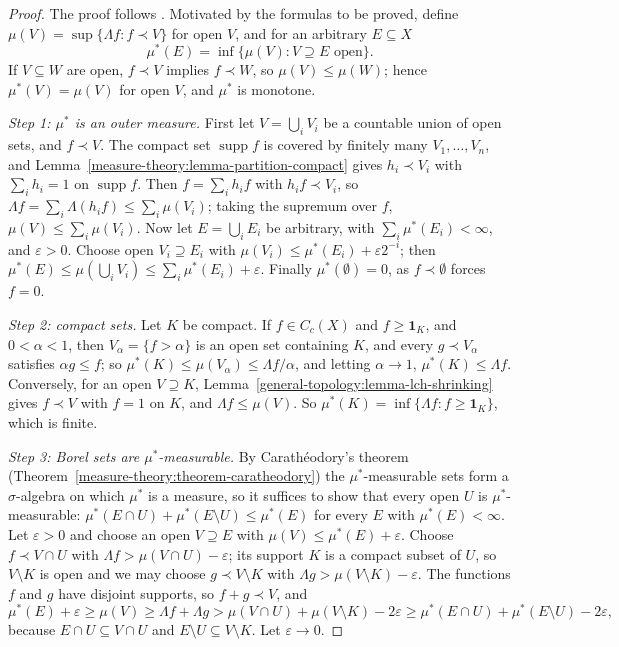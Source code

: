 \begin{proof}
The proof follows \cite[Theorem 2.14]{rudin-rca}. Motivated by the formulas to be proved, define $\mu(V) = \sup\{\Lambda f : f \prec V\}$ for open $V$, and for an arbitrary $E \subseteq X$
\[
\mu^*(E) = \inf\{\mu(V) : V \supseteq E \text{ open}\}.
\]
If $V \subseteq W$ are open, $f \prec V$ implies $f \prec W$, so $\mu(V) \leq \mu(W)$; hence $\mu^*(V) = \mu(V)$ for open $V$, and $\mu^*$ is monotone.

\emph{Step 1: $\mu^*$ is an outer measure.} First let $V = \bigcup_iV_i$ be a countable union of open sets, and $f \prec V$. The compact set $\operatorname{supp}f$ is covered by finitely many
$V_1, \ldots, V_n$, and Lemma~\ref{measure-theory:lemma-partition-compact} gives $h_i \prec V_i$ with $\sum_ih_i = 1$ on $\operatorname{supp}f$. Then $f = \sum_ih_if$ with $h_if \prec V_i$, so
$\Lambda f = \sum_i\Lambda(h_if) \leq \sum_i\mu(V_i)$; taking the supremum over $f$, $\mu(V) \leq \sum_i\mu(V_i)$. Now let $E = \bigcup_iE_i$ be arbitrary, with $\sum_i\mu^*(E_i) < \infty$, and
$\varepsilon > 0$. Choose open $V_i \supseteq E_i$ with $\mu(V_i) \leq \mu^*(E_i) + \varepsilon2^{-i}$; then
$\mu^*(E) \leq \mu(\bigcup_iV_i) \leq \sum_i\mu^*(E_i) + \varepsilon$. Finally $\mu^*(\emptyset) = 0$, as $f \prec \emptyset$ forces $f = 0$.

\emph{Step 2: compact sets.} Let $K$ be compact. If $f \in C_c(X)$ and $f \geq \mathbf{1}_K$, and $0 < \alpha < 1$, then $V_\alpha = \{f > \alpha\}$ is an open set containing $K$, and every $g \prec V_\alpha$
satisfies $\alpha g \leq f$; so $\mu^*(K) \leq \mu(V_\alpha) \leq \Lambda f/\alpha$, and letting $\alpha \to 1$, $\mu^*(K) \leq \Lambda f$. Conversely, for an open $V \supseteq K$,
Lemma~\ref{general-topology:lemma-lch-shrinking} gives $f \prec V$ with $f = 1$ on $K$, and $\Lambda f \leq \mu(V)$. So $\mu^*(K) = \inf\{\Lambda f : f \geq \mathbf{1}_K\}$, which is finite.

\emph{Step 3: Borel sets are $\mu^*$-measurable.} By Carath\'eodory's theorem (Theorem~\ref{measure-theory:theorem-caratheodory}) the $\mu^*$-measurable sets form a $\sigma$-algebra on which $\mu^*$ is a
measure, so it suffices to show that every open $U$ is $\mu^*$-measurable: $\mu^*(E \cap U) + \mu^*(E \setminus U) \leq \mu^*(E)$ for every $E$ with $\mu^*(E) < \infty$. Let $\varepsilon > 0$ and
choose an open $V \supseteq E$ with $\mu(V) \leq \mu^*(E) + \varepsilon$. Choose $f \prec V \cap U$ with $\Lambda f > \mu(V \cap U) - \varepsilon$; its support $K$ is a compact subset of $U$, so
$V \setminus K$ is open and we may choose $g \prec V \setminus K$ with $\Lambda g > \mu(V \setminus K) - \varepsilon$. The functions $f$ and $g$ have disjoint supports, so $f + g \prec V$, and
\[
\mu^*(E) + \varepsilon \geq \mu(V) \geq \Lambda f + \Lambda g > \mu(V \cap U) + \mu(V \setminus K) - 2\varepsilon \geq \mu^*(E \cap U) + \mu^*(E \setminus U) - 2\varepsilon,
\]
because $E \cap U \subseteq V \cap U$ and $E \setminus U \subseteq V \setminus K$. Let $\varepsilon \to 0$.


\end{proof}
